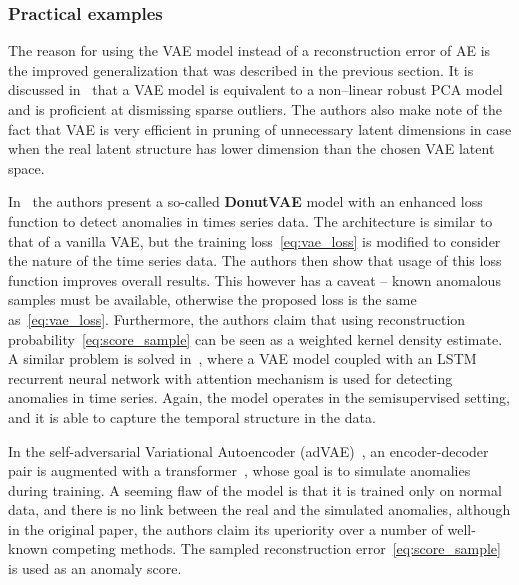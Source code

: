 \subsubsection{Practical examples}
The reason for using the VAE model instead of a reconstruction error of AE is the improved generalization that was described in the previous section. It is discussed in~\cite{dai2017hidden} that a VAE model is equivalent to a non--linear robust PCA model and is proficient at dismissing sparse outliers. The authors also make note of the fact that VAE is very efficient in pruning of unnecessary latent dimensions in case when the real latent structure has lower dimension than the chosen VAE latent space.

In~\cite{xu2018unsupervised} the authors present a so-called \textbf{DonutVAE} model with an enhanced loss function to detect anomalies in times series data. The architecture is similar to that of a vanilla VAE, but the training loss~\eqref{eq:vae_loss} is modified to consider the nature of the time series data. The authors then show that usage of this loss function improves overall results. This however has a caveat -- known anomalous samples must be available, otherwise the proposed loss is the same as~\eqref{eq:vae_loss}. Furthermore, the authors claim that using reconstruction probability~\eqref{eq:score_sample} can be seen as a weighted kernel density estimate. A similar problem is solved in~\cite{pereira2018unsupervised}, where a VAE model coupled with an LSTM recurrent neural network with attention mechanism is used for detecting anomalies in time series. Again, the model operates in the semisupervised setting, and it is able to capture the temporal structure in the data. 

In the self-adversarial Variational Autoencoder (adVAE)~\cite{wang2020advae}, an encoder-decoder pair is augmented with a transformer~\cite{vaswani2017attention}, whose goal is to simulate anomalies during training. A seeming flaw of the model is that it is trained only on normal data, and there is no link between the real and the simulated anomalies, although in the original paper, the authors claim its uperiority over a number of well-known competing methods. The sampled reconstruction error~\ref{eq:score_sample} is used as an anomaly score.

